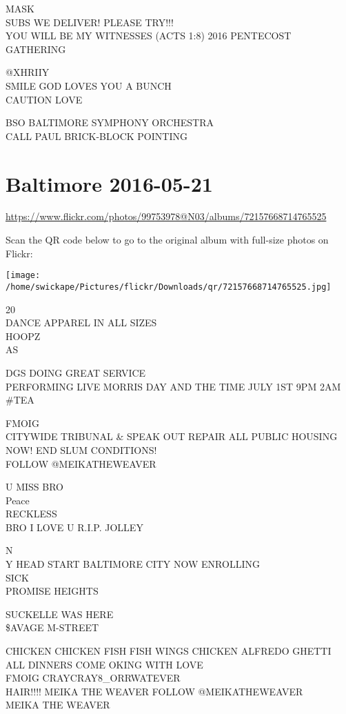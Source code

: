 \documentclass[10pt,letterpaper]{article}
\begin{document}
MASK\\
SUBS WE DELIVER!  PLEASE TRY!!!\\
YOU WILL BE MY WITNESSES (ACTS 1:8) 2016 PENTECOST GATHERING

@XHRIIY\\
SMILE GOD LOVES YOU A BUNCH\\
CAUTION LOVE

BSO BALTIMORE SYMPHONY ORCHESTRA\\
CALL PAUL BRICK{-}BLOCK POINTING
\pagebreak

\section*{Baltimore 2016-05-21}

\url{https://www.flickr.com/photos/99753978@N03/albums/72157668714765525}

Scan the QR code below to go to the original album with full-size photos on Flickr:

\texttt{[image: /home/swickape/Pictures/flickr/Downloads/qr/72157668714765525.jpg]}
\pagebreak

20\\
DANCE APPAREL IN ALL SIZES\\
HOOPZ\\
AS

DGS DOING GREAT SERVICE\\
PERFORMING LIVE MORRIS DAY AND THE TIME JULY 1ST 9PM 2AM\\
\#TEA

FMOIG\\
CITYWIDE TRIBUNAL \& SPEAK OUT REPAIR ALL PUBLIC HOUSING NOW!  END SLUM CONDITIONS!\\
FOLLOW @MEIKATHEWEAVER

U MISS BRO\\
Peace\\
RECKLESS\\
BRO I LOVE U R.I.P. JOLLEY

N\\
Y HEAD START BALTIMORE CITY NOW ENROLLING\\
SICK\\
PROMISE HEIGHTS

SUCKELLE WAS HERE\\
\$AVAGE M{-}STREET

CHICKEN CHICKEN FISH FISH WINGS CHICKEN ALFREDO GHETTI ALL DINNERS COME OKING WITH LOVE\\
FMOIG CRAYCRAY8\_ORRWATEVER\\
HAIR!!!! MEIKA THE WEAVER FOLLOW @MEIKATHEWEAVER\\
MEIKA THE WEAVER
\end{document}
